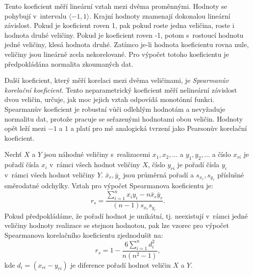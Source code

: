 Tento koeficient měří lineární vztah mezi dvěma proměnnými. Hodnoty se pohybují v~intervalu $\langle -1, 1 \rangle$. Krajní hodnoty znamenají dokonalou lineární závislost. Pokud je koeficient roven 1, pak pokud roste jedna veličina, roste i hodnota druhé veličiny. Pokud je koeficient roven -1, potom s~rostoucí hodnotu jedné veličiny, klesá hodnota druhé. Zatímco je-li hodnota koeficientu rovna nule, veličiny jsou lineárně zcela nekorelované. Pro výpočet totoho koeficientu je předpokládána normalita zkoumaných dat.\cite{bib:MB}

Další koeficient, který měří korelaci mezi dvěma veličinami, je \emph{Spearmanův korelační koeficient}. Tento neparametrický koeficient měří nelineární závislost dvou veličin, určuje, jak moc jejich vztah odpovídá monotónní funkci. Spearmanův koeficient je robustní vůči odlehlým hodnotám a nevyžaduje normalitu dat, protože pracuje se seřazenými hodnotami obou veličin. Hodnoty opět leží mezi $-1$ a $1$ a platí pro mě analogická tvrzení jako Pearsonův korelační koeficient.\cite{bib:MB,bib:correlation}

Nechť $X$ a $Y$ jsou náhodné veličiny s~realizacemi $x_1, x_2, \ldots$ a $y_1, y_2, \ldots$ a číslo $x_{ri}$ je pořadí čísla $x_i$ v~rámci všech hodnot veličiny $X$, číslo $y_{ri}$ je pořadí čísla $y_i$ v~rámci všech hodnot veličiny $Y$. $\bar{x}_r, \bar{y}_r$ jsou průměrná pořadí a $s_{x_r}, s_{y_r}$ příslušné směrodatné odchylky. Vztah pro výpočet Spearmanova koeficientu je:
\begin{equation}
    r_s =
    \frac{ \sum_{i=1}^{n}x_iy_i - n\bar{x}_r\bar{y}_r }
    {
          (n-1) s_{x_r} s_{y_r}
    }.
\end{equation}
Pokud předpokládáme, že pořadí hodnot je unikátní, tj. neexistují v~rámci jedné veličiny hodnoty realizace se stejnou hodnotou, pak lze vzorec pro výpočet Spearmanova korelačního koeficientu zjednodušit na:
\begin{equation}
    r_s = 1-
    \frac{ 6 \sum_{i=1}^{n}d_i^2 }{n(n^2-1)},
\end{equation}
kde $d_i = (x_{ri} - y_{ri})$ je diference pořadí hodnot veličin $X$ a $Y$.\cite{bib:MB,bib:correlation}

